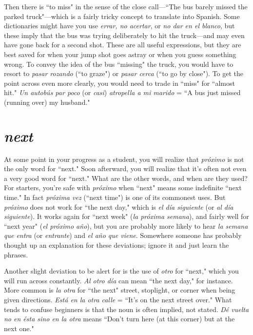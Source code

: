 Then there is ``to miss" in the sense of the close call---``The
bus barely missed the parked truck"---which is a fairly tricky concept
to translate into Spanish. Some dictionaries might have you use \emph{errar,
	no acertar}, or \emph{no dar en el blanco}, but these imply that the bus was
trying deliberately to hit the truck---and may even have gone back for
a second shot. These are all useful expressions, but they are best saved
for when your jump shot goes astray or when you guess something
wrong. To convey the idea of the bus ``missing" the truck, you would
have to resort to \emph{pasar rozando} (``to graze") or \emph{pasar cerca} (``to go by
close"). To get the point across even more clearly, you would need to
trade in ``miss" for ``almost hit." \emph{Un autobús par poco} (or \emph{casi}) \emph{atropella a mi marido} = ``A bus just missed (running over) my husband."

\section{\emph{next}}

At some point in your progress as a student, you will realize
that \emph{próximo} is not the only word for ``next." Soon afterward, you will
realize that it's often not even a very good word for ``next." What are
the other words, and when are they used? For starters, you're safe with
\emph{próximo} when ``next" means some indefinite ``next time." In fact
\emph{próxima vez} (``next time") is one of its commonest uses. But \emph{próximo}
does not work for ``the next day," which is \emph{el día siguiente} (or \emph{al día
	siguiente}). It works again for ``next week" (\emph{la próxima semana}), and
fairly well for ``next year" (\emph{el próximo año}), but you are probably more
likely to hear \emph{la semana que entra} (or \emph{entrante}) and \emph{el año que viene}.
Somewhere someone has probably thought up an explanation for these
deviations; ignore it and just learn the phrases.

Another slight deviation to be alert for is the use of \emph{otro} for
``next," which you will run across constantly. \emph{Al otro día} can mean
``the next day," for instance. More common is \emph{la otra} for ``the next"
street, stoplight, or corner when being given directions. \emph{Está en la otra
	calle} = ``It's on the next street over." What tends to confuse beginners
is that the noun is often implied, not stated. \emph{Dé vuelta no en ésta sino
	en la otra} means ``Don't turn here (at this corner) but at the next one."

